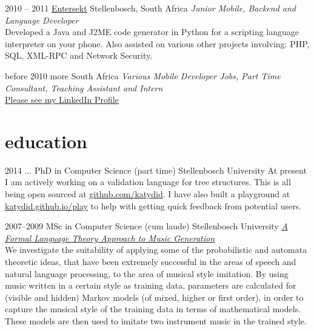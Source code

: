 \documentclass[print]{friggeri-cv-a4} %
\begin{document}
\begin{entrylist}
\entry
{2010 -- 2011}
{\href{https://www.entersekt.com/}{Entersekt}}
{Stellenbosch, South Africa}
{\emph{Junior Mobile, Backend and Language Developer} \\
Developed a Java and J2ME code generator in Python for a scripting language interpreter on your phone.
Also assisted on various other projects involving: PHP, SQL, XML-RPC and Network Security.}

\entry
{before 2010}
{more}
{South Africa}
{\emph{Various Mobile Developer Jobs, Part Time Consultant, Teaching Assistant and Intern} \\
\href{https://za.linkedin.com/in/schulzewalter}{Please see my LinkedIn Profile}
}

\end{entrylist}

\newpage

\section{education}

\begin{entrylist}

\entry
{2014 ...}
{PhD {\normalfont in Computer Science} (part time)}
{Stellenbosch University}
{At present I am actively working on a validation language for tree structures.
This is all being open sourced at \href{https://github.com/katydid}{github.com/katydid}.
I have also built a playground at \href{https://katydid.github.io/play}{katydid.github.io/play} to help with getting quick feedback from potential users.}

\entry
{2007--2009}
{MSc {\normalfont in Computer Science} (cum laude)}
{Stellenbosch University}
{\href{http://superwillow.sourceforge.net/}{\emph{A Formal Language Theory Approach to Music Generation}} \\ We investigate the suitability of applying some of the probabilistic and automata theoretic ideas, that have been extremely successful in the areas of speech and natural language processing, to the area of musical style imitation. By using music written in a certain style as training data, parameters are calculated for (visible and hidden) Markov models (of mixed, higher or first order), in order to capture the musical style of the training data in terms of mathematical models. These models are then used to imitate two instrument music in the trained style.}

\end{entrylist}
\end{document}
